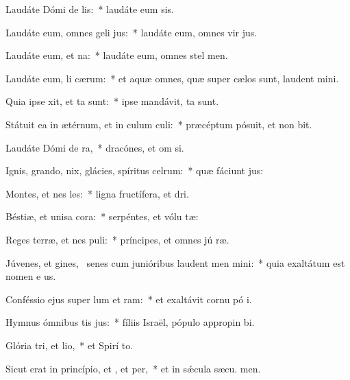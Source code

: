 \item Laudáte Dómi de lis:~* laudáte eum  sis.
\item Laudáte eum, omnes geli jus:~* laudáte eum, omnes vir jus.
\item Laudáte eum,  et na:~* laudáte eum, omnes stel  men.
\item Laudáte eum, li cærum:~* et aquæ omnes, quæ super cælos sunt, laudent  mini.
\item Quia ipse xit, et ta sunt:~* ipse mandávit,  ta sunt.
\item Státuit ea in ætérnum, et in culum culi:~* præcéptum pósuit, et non bit.
\item Laudáte Dómi de ra,~* dracónes, et om si.
\item Ignis, grando, nix, glácies, spíritus celrum:~* quæ fáciunt  jus:
\item Montes, et nes les:~* ligna fructífera, et  dri.
\item Béstiæ, et unisa cora:~* serpéntes, et vólu tæ:
\item Reges terræ, et nes puli:~* príncipes, et omnes jú ræ.
\item Júvenes, et gines,~\pscross{} senes cum junióribus laudent men mini:~* quia exaltátum est nomen e us.
\item Conféssio ejus super lum et ram:~* et exaltávit cornu pó i.
\item Hymnus ómnibus tis jus:~* fíliis Israël, pópulo appropin bi.
\item Glória tri, et lio,~* et Spirí to.
\item Sicut erat in princípio, et , et per,~* et in sǽcula sæcu. men.
